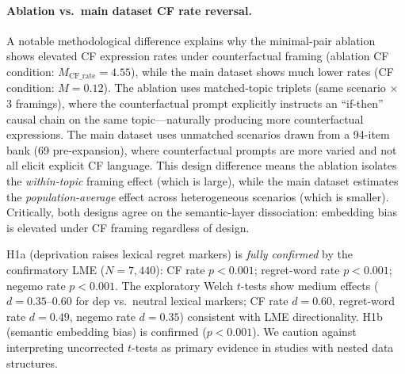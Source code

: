 \documentclass[11pt]{article}
\begin{document}
\paragraph{Ablation vs.\ main dataset CF rate reversal.}
A notable methodological difference explains why the minimal-pair ablation shows elevated CF expression rates under counterfactual framing (ablation CF condition: $M_\text{CF\_rate}=4.55$), while the main dataset shows much lower rates (CF condition: $M=0.12$). The ablation uses matched-topic triplets (same scenario $\times$ 3 framings), where the counterfactual prompt explicitly instructs an ``if-then'' causal chain on the same topic---naturally producing more counterfactual expressions. The main dataset uses unmatched scenarios drawn from a 94-item bank (69 pre-expansion), where counterfactual prompts are more varied and not all elicit explicit CF language. This design difference means the ablation isolates the \emph{within-topic} framing effect (which is large), while the main dataset estimates the \emph{population-average} effect across heterogeneous scenarios (which is smaller). Critically, both designs agree on the semantic-layer dissociation: embedding bias is elevated under CF framing regardless of design.

H1a (deprivation raises lexical regret markers) is \textit{fully confirmed} by the confirmatory LME ($N=7{,}440$): CF rate $p<0.001$; regret-word rate $p<0.001$; negemo rate $p<0.001$. The exploratory Welch $t$-tests show medium effects ($d=0.35$--$0.60$ for dep vs.\ neutral lexical markers; CF rate $d=0.60$, regret-word rate $d=0.49$, negemo rate $d=0.35$) consistent with LME directionality. H1b (semantic embedding bias) is confirmed ($p<0.001$). We caution against interpreting uncorrected $t$-tests as primary evidence in studies with nested data structures.
\end{document}

